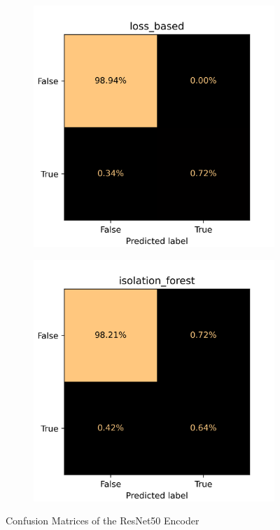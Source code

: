 \begin{figure}[!ht]
    \centering
    \begin{subfigure}{0.4\textwidth}
        \centering
        \includegraphics[width=\textwidth,trim={0 1cm 0 1cm},clip]{./results/resnet50_vgg19/20230514_213740_loss_based_cm.png}
    \end{subfigure}
    \begin{subfigure}{0.4\textwidth}
        \centering
        \includegraphics[width=\textwidth,trim={0 1cm 0 1cm},clip]{./results/resnet50_vgg19/20230514_213740_isolation_forest_cm.png}
    \end{subfigure}
    \caption{Confusion Matrices of the ResNet50 Encoder}
    \label{fig:resnet50_cm}
\end{figure}